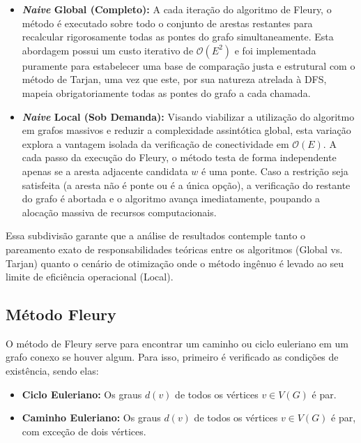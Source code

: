 \documentclass[12pt]{article}
\begin{document}
\begin{itemize}
    \item \textbf{\textit{Naive} Global (Completo):} A cada iteração do algoritmo de Fleury, o método é executado sobre todo o conjunto de arestas restantes para recalcular rigorosamente todas as pontes do grafo simultaneamente. Esta abordagem possui um custo iterativo de $\mathcal{O}(E^2)$ e foi implementada puramente para estabelecer uma base de comparação justa e estrutural com o método de Tarjan, uma vez que este, por sua natureza atrelada à DFS, mapeia obrigatoriamente todas as pontes do grafo a cada chamada.
    
    \item \textbf{\textit{Naive} Local (Sob Demanda):} Visando viabilizar a utilização do algoritmo em grafos massivos e reduzir a complexidade assintótica global, esta variação explora a vantagem isolada da verificação de conectividade em $\mathcal{O}(E)$. A cada passo da execução do Fleury, o método testa de forma independente apenas se a aresta adjacente candidata $w$ é uma ponte. Caso a restrição seja satisfeita (a aresta não é ponte ou é a única opção), a verificação do restante do grafo é abortada e o algoritmo avança imediatamente, poupando a alocação massiva de recursos computacionais.
\end{itemize}

Essa subdivisão garante que a análise de resultados contemple tanto o pareamento exato de responsabilidades teóricas entre os algoritmos (Global vs. Tarjan) quanto o cenário de otimização onde o método ingênuo é levado ao seu limite de eficiência operacional (Local).

\subsection{Método Fleury} \label{fleury}

O método de Fleury serve para encontrar um caminho ou ciclo euleriano em um grafo conexo se houver algum. Para isso, primeiro é verificado as condições de existência, sendo elas:

\begin{itemize}
    \item \textbf{Ciclo Euleriano:} Os graus $d(v)$ de todos os vértices $v \in V(G)$ é par.
    \item \textbf{Caminho Euleriano:} Os graus $d(v)$ de todos os vértices $v \in V(G)$ é par, com exceção de dois vértices.
\end{itemize}
\end{document}
